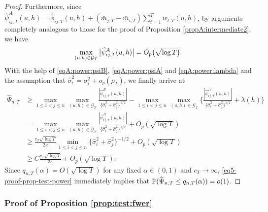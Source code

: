 \begin{proof}
Furthermore, since $\widehat\psi_{ij,T}^A(u, h) = \widehat\phi_{ij,T}(u, h) + (\bar{m}_{j, T} - \bar{m}_{i, T}) \sum_{t=1}^T w_{t, T}(u, h)$, by arguments completely analogous to those for the proof of Proposition \ref{propA:intermediate2}, we have
\begin{align}\label{eqA:power:psiA}
\max_{(u, h) \in \mathcal{G}_T} \big|\widehat\psi_{ij,T}^A(u, h)\big|  = O_p\big(\sqrt{\log T}\big).
\end{align}
With the help of \eqref{eqA:power:psiB}, \eqref{eqA:power:psiA} and \eqref{eqA:power:lambda} and the assumption that $\widehat{\sigma}^2_i = \sigma^2_i + o_p(\rho_T)$, we finally arrive at 
{\color{red}
\begin{align}
\widehat{\Psi}_{n, T}  & \ge \max_{1 \le i < j \le n} \max_{(u,h) \in \mathcal{G}_T} \frac{|\widehat{\psi}_{ij, T}^B(u,h)|}{\{\widehat{\sigma}_i^2 + \widehat{\sigma}_j^2\}^{1/2}} - \max_{1 \le i < j \le n} \max_{(u,h) \in \mathcal{G}_T} \bigg\{ \frac{|\widehat{\psi}_{ij, T}^A(u,h)|}{\{\widehat{\sigma}^2_i + \widehat{\sigma}_j^2\}^{1/2}} + \lambda(h) \bigg\} \nonumber \\
 & = \max_{1 \le i < j \le n} \max_{(u,h) \in \mathcal{G}_T} \frac{|\widehat{\psi}_{ij, T}^B(u,h)|}{\{\widehat{\sigma}_i^2 + \widehat{\sigma}_j^2\}^{1/2}} + O_p(\sqrt{\log T}) \nonumber \\
 & \ge \frac{c_T \sqrt{\log T}}{2 \kappa} \min_{1 \le i < j \le n}\{\widehat{\sigma}_i^2 + \widehat{\sigma}_j^2\}^{-1/2} + O_p(\sqrt{\log T})\nonumber \\
  & \ge C\frac{c_T \sqrt{\log T}}{2 \kappa} + O_p(\sqrt{\log T}). \label{eq5-proof-prop-test-power}
\end{align}}
Since $q_{n, T}(\alpha) = O(\sqrt{\log T})$ for any fixed $\alpha \in (0,1)$ and $c_T \to \infty$, \eqref{eq5-proof-prop-test-power} immediately implies that $\mathbb{P}(\widehat{\Psi}_{n, T} \le q_{n, T}(\alpha)) = o(1)$. 
\end{proof}

\subsubsection*{Proof of Proposition \ref{prop:test:fwer}}\label{subsec:app:fwer}

